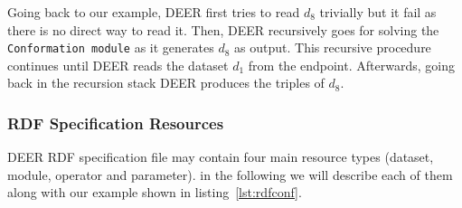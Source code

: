 \documentclass[a4paper,twoside,bibtotoc,abstracton,12pt,BCOR=15mm]{article}
\newcommand{\geolift}{\textsc{DEER}\xspace}
\begin{document}
Going back to our example, \geolift first tries to read $d_8$ trivially but it fail as there is no direct way to read it. 
Then, \geolift recursively goes for solving the \texttt{Conformation module} as it generates $d_8$ as output. 
This recursive procedure continues until \geolift reads the dataset $d_1$ from the endpoint.
Afterwards, going back in the recursion stack \geolift produces the triples of $d_8$.

\subsubsection{RDF Specification Resources} 

\geolift RDF specification file may contain four main resource types (dataset, module, operator and parameter). 
in the following we will describe each of them along with our example shown in listing~\ref{lst:rdfconf}. 

\end{document}
